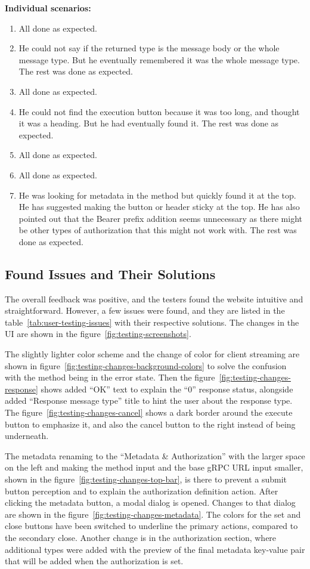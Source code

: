 \textbf{Individual scenarios:}
\begin{enumerate}
    \item All done as expected.
    \item He could not say if the returned type is the message body or the whole message type.
    But he eventually remembered it was the whole message type.
    The rest was done as expected.
    \item All done as expected.
    \item He could not find the execution button because it was too long, and thought it was a heading.
    But he had eventually found it.
    The rest was done as expected.
    \item All done as expected.
    \item All done as expected.
    \item He was looking for metadata in the method but quickly found it at the top.
    He has suggested making the button or header sticky at the top.
    He has also pointed out that the Bearer prefix addition seems unnecessary as there might be other types of authorization that this might not work with.
    The rest was done as expected.
\end{enumerate}

\subsection{Found Issues and Their Solutions}\label{subsec:found-issues-and-their-solutions}
The overall feedback was positive, and the testers found the website intuitive and straightforward.
However, a few issues were found, and they are listed in the table~\ref{tab:user-testing-issues} with their respective solutions.
The changes in the UI are shown in the figure~\ref{fig:testing-screenshots}.

The slightly lighter color scheme and the change of color for client streaming are shown in figure~\ref{fig:testing-changes-background-colors} to solve the confusion with the method being in the error state.
Then the figure~\ref{fig:testing-changes-response} shows added \enquote{OK} text to explain the \enquote{0} response status, alongside added \enquote{Response message type} title to hint the user about the response type.
The figure~\ref{fig:testing-changes-cancel} shows a dark border around the execute button to emphasize it, and also the cancel button to the right instead of being underneath.

The metadata renaming to the \enquote{Metadata \& Authorization} with the larger space on the left and making the method input and the base gRPC URL input smaller, shown in the figure~\ref{fig:testing-changes-top-bar}, is there to prevent a submit button perception and to explain the authorization definition action.
After clicking the metadata button, a modal dialog is opened. 
Changes to that dialog are shown in the figure~\ref{fig:testing-changes-metadata}.
The colors for the set and close buttons have been switched to underline the primary actions, compared to the secondary close.
Another change is in the authorization section, where additional types were added with the preview of the final metadata key-value pair that will be added when the authorization is set.

